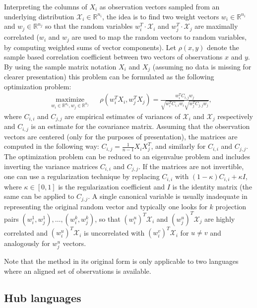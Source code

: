 \documentclass[twoside,11pt]{article}
\newcommand{\RR}{\mathbb{R}}
\begin{document}
Interpreting the columns of $X_i$ as observation vectors sampled from an underlying distribution $\mathcal{X}_i \in \RR^{n_i}$, the idea is to find two weight vectors $w_i \in \RR^{n_i}$ and $w_j \in \RR^{n_j}$ so that the random variables $w_i^T \cdot \mathcal{X}_i$ and $w_j^T \cdot \mathcal{X}_j$ are maximally correlated ($w_i$ and $w_j$ are used to map the random vectors to random variables, by computing weighted sums of vector components). Let $\rho(x,y)$ denote the sample based correlation coefficient between two vectors of observations $x$ and $y$. By using the sample matrix notation $X_i$ and $X_j$ (assuming no data is missing for clearer presentation) this problem can be formulated as the following optimization problem:
\begin{equation*}
\begin{aligned}
& \underset{w_i \in \RR^{n_i}, w_j \in \RR^{n_j}}{\text{maximize}}
& & \rho(w_i^T X_i , w_j^T X_j) = \frac{w_i^T C_{i,j} w_j}{\sqrt{w_i^T C_{i,i} w_i} \sqrt{w_j^T C_{j,j} w_j}},
\end{aligned}
\end{equation*}
where $C_{i,i}$ and $C_{j,j}$ are empirical estimates of variances of $\mathcal{X}_i$ and $\mathcal{X}_j$ respectively and $C_{i,j}$ is an estimate for the covariance matrix. Assuming that the observation vectors are centered (only for the purposes of presentation), the matrices are computed in the following way: $C_{i,j} = \frac{1}{n-1}X_i X_j^T$, and similarly for $C_{i,i}$ and $C_{j,j}$.
The optimization problem can be reduced to an eigenvalue problem and includes inverting the variance matrices $C_{i,i}$ and $C_{j,j}$. If the matrices are not invertible, one can use a regularization technique by replacing $C_{i,i}$ with $(1- \kappa)C_{i,i} + \kappa I$, where $\kappa \in [0,1]$ is the regularization coefficient and $I$ is the identity matrix (the same can be applied to $C_{j,j}$.
A single canonical variable is usually inadequate in representing the original random vector and typically one looks for $k$ projection pairs $(w_i^1, w_j^1),\ldots,(w_i^k, w_j^k)$, so that $(w_i^{u})^T \mathcal{X}_i$ and $(w_j^{u})^T \mathcal{X}_j$ are highly correlated and $(w_i^{u})^T \mathcal{X}_i$ is uncorrelated with $(w_i^{v})^T \mathcal{X}_i$  for $u \neq v$ and analogously for $w_j^u$ vectors.

Note that the method in its original form is only applicable to two languages where an aligned set of observations is available.

\subsection{Hub languages}
\end{document}
